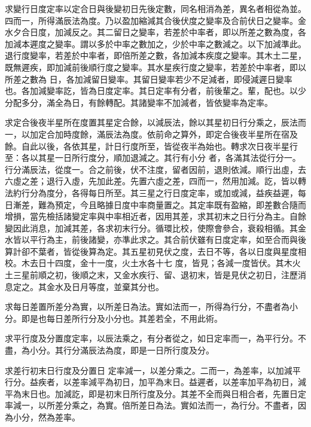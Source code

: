 \begin{pinyinscope}
 求變行日度定率以定合日與後變初日先後定數，同名相消為差，異名者相從為並。四而一，所得滿辰法為度。乃以盈加縮減其合後伏度之變率及合前伏日之變率。金水夕合日度，加減反之。其二留日之變率，若差於中率者，即以所差之數為度，各加減本遲度之變率。謂以多於中率之數加之，少於中率之數減之。以下加減準此。退行度變率，若差於中率者，即倍所差之數，各加減本疾度之變率。其木土二星，既無遲疾，即加減前後順行度之變率。其水星疾行度之變率，若差於中率者，即以所差之數為
 日，各加減留日變率。其留日變率若少不足減者，即侵減遲日變率也。各加減變率訖，皆為日度定率。其日定率有分者，前後輩之。輩，配也。以少分配多分，滿全為日，有餘轉配。其諸變率不加減者，皆依變率為定率。



 求定合後夜半星所在度置其星定合餘，以減辰法，餘以其星初日行分乘之，辰法而一，以加定合加時度餘，滿辰法為度。依前命之算外，即定合後夜半星所在宿及餘。自此以後，各依其星，計日行度所至，皆從夜半為始也。轉求次日夜半星行至：各以其星一日所行度分，順加退減之。其行有小分
 者，各滿其法從行分一。行分滿辰法，從度一。合之前後，伏不注度，留者因前，退則依減。順行出虛，去六虛之差；退行入虛，先加此差。先置六虛之差，四而一，然用加減。訖，皆以轉法約行分為度分，各得每日所至。其三星之行日度定率，或加或減，益疾益遲，每日漸差，難為預定，今且略據日度中率商量置之。其定率既有盈縮，即差數合隨而增損，當先檢括諸變定率與中率相近者，因用其差，求其初末之日行分為主。自餘變因此消息，加減其差，各求初末行分。循環比校，使際會參合，衰殺相循。其金水皆以平行為主，前後諸變，亦準此求之。其合前伏雖有日度定率，如至合而與後算計卻不葉者，皆從後算為定。其五星初見伏之度，去日不等，各以日度與星度相校。木去日十四度，金十一度，火土水各十七
 度，皆見；各減一度皆伏。其木火土三星前順之初，後順之末，又金水疾行、留、退初末，皆是見伏之初日，注歷消息定之。其金水及日月等度，並棄其分也。



 求每日差置所差分為實，以所差日為法。實如法而一，所得為行分，不盡者為小分。即是也每日差所行分及小分也。其差若全，不用此術。



 求平行度及分置度定率，以辰法乘之，有分者從之，如日定率而一，為平行分。不盡，為小分。其行分滿辰法為度，即是一日所行度及分。



 求差行初末日行度及分置日
 定率減一，以差分乘之。二而一，為差率，以加減平行分。益疾者，以差率減平為初日，加平為末日。益遲者，以差率加平為初日，減平為末日也。加減訖，即是初末日所行度及分。其差不全而與日相合者，先置日定率減一，以所差分乘之，為實。倍所差日為法。實如法而一，為行分。不盡者，因為小分，然為差率。




\end{pinyinscope}
